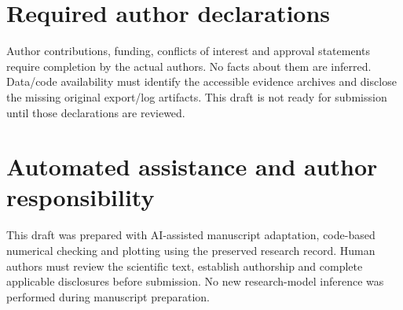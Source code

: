 \documentclass[computers,article,submit,moreauthors]{Definitions/mdpi}
\begin{document}
\section*{Required author declarations}
Author contributions, funding, conflicts of interest and approval statements require completion by the actual authors. No facts about them are inferred. Data/code availability must identify the accessible evidence archives and disclose the missing original export/log artifacts. This draft is not ready for submission until those declarations are reviewed.
\section*{Automated assistance and author responsibility}
This draft was prepared with AI-assisted manuscript adaptation, code-based numerical checking and plotting using the preserved research record. Human authors must review the scientific text, establish authorship and complete applicable disclosures before submission. No new research-model inference was performed during manuscript preparation.


\end{document}
